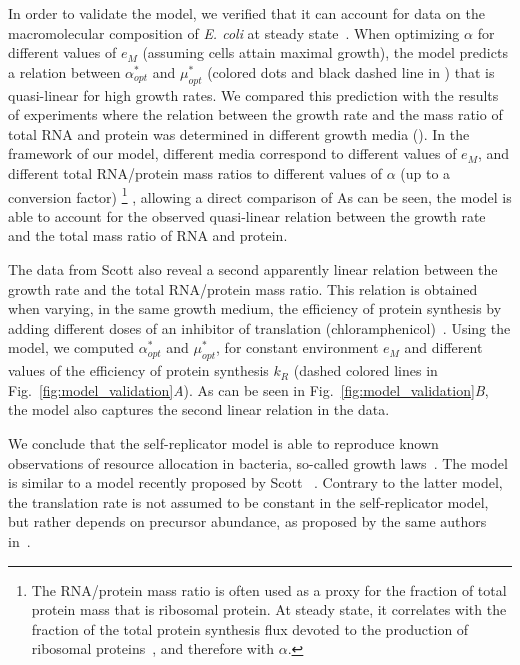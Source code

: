 In order to validate the model, we verified that it can account for data on the macromolecular composition of \textit{E. coli} at steady state~\cite{scott_interdependence_2010}.
When optimizing $\alpha$ for different values of $e_M$ (assuming cells attain maximal growth), the model predicts a relation between $\alpha^*_{opt}$ and $\mu^*_{opt}$ (colored dots and black dashed line in ) that is quasi-linear for high growth rates.
We compared this prediction with the results of experiments where the relation between the growth rate and the mass ratio of total RNA and protein was determined in different growth media ().
In the framework of our model, different media correspond to different values of $e_M$, and different total RNA/protein mass ratios to different values of $\alpha$ (up to a conversion factor)
\footnote{The RNA/protein mass ratio is often used as a proxy for the fraction of total protein mass that is ribosomal protein.
At steady state, it correlates with the fraction of the total protein synthesis flux devoted to the production of ribosomal proteins~\cite{scott_interdependence_2010}, and therefore with $\alpha$.}
, allowing a direct comparison of 
As can be seen, the model is able to account for the observed quasi-linear relation between the growth rate and the total mass ratio of RNA and protein. 

The data from Scott \etal also reveal a second apparently linear relation between the growth rate and the total RNA/protein mass ratio.
This relation is obtained when varying, in the same growth medium, the efficiency of protein synthesis by adding different doses of an inhibitor of translation (chloramphenicol)~\cite{scott_interdependence_2010}.
Using the model, we computed $\alpha^*_{opt}$ and $\mu^*_{opt}$, for constant environment $e_M$ and different values of the efficiency of protein synthesis $k_R$ (dashed colored lines in Fig.~\ref{fig:model_validation}\textit{A}).
As can be seen in Fig.~\ref{fig:model_validation}\textit{B}, the model also captures the second linear relation in the data.

We conclude that the self-replicator model is able to reproduce known observations of resource allocation in bacteria, so-called growth laws~\cite{scott_interdependence_2010}.
The model is similar to a model recently proposed by Scott \etal~\cite{scott_emergence_2014}.
Contrary to the latter model, the translation rate is not assumed to be constant in the self-replicator model, but rather depends on precursor abundance, as proposed by the same authors in~\cite{klumpp_molecular_2013}.

